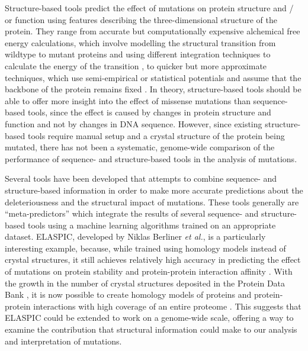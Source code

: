 Structure-based tools predict the effect of mutations on protein structure and / or function using features describing the three-dimensional structure of the protein. They range from accurate but computationally expensive alchemical free energy calculations, which involve modelling the structural transition from wildtype to mutant proteins and using different integration techniques to calculate the energy of the transition \cite{monticelli_introduction_2013}, to quicker but more approximate techniques, which use semi-empirical or statistical potentials and assume that the backbone of the protein remains fixed \cite{benedix_predicting_2009,pires_mcsm:_2014,laimer_maestro_2015,petukh_predicting_2015}. In theory, structure-based tools should be able to offer more insight into the effect of missense mutations than sequence-based tools, since the effect is caused by changes in protein structure and function and not by changes in DNA sequence. However, since existing structure-based tools require manual setup and a crystal structure of the protein being mutated, there has not been a systematic, genome-wide comparison of the performance of sequence- and structure-based tools in the analysis of mutations.

Several tools have been developed that attempts to combine sequence- and structure-based information in order to make more accurate predictions about the deleteriousness \cite{baugh_robust_2016} and the structural impact \cite{dehouck_fast_2009,berliner_combining_2014,li_mutabind_2016} of mutations. These tools generally are ``meta-predictors'' which integrate the results of several sequence- and structure-based tools using a machine learning algorithms trained on an appropriate dataset. ELASPIC, developed by Niklas Berliner \textit{et al.}, is a particularly interesting example, because, while trained using homology models instead of crystal structures, it still achieves relatively high accuracy in predicting the effect of mutations on protein stability and protein-protein interaction affinity \cite{berliner_combining_2014}. With the growth in the number of crystal structures deposited in the Protein Data Bank \cite{berman_protein_2000}, it is now possible to create homology models of proteins and protein-protein interactions with high coverage of an entire proteome \cite{mosca_interactome3d:_2013}. This suggests that ELASPIC could be extended to work on a genome-wide scale, offering a way to examine the contribution that structural information could make to our analysis and interpretation of mutations.

